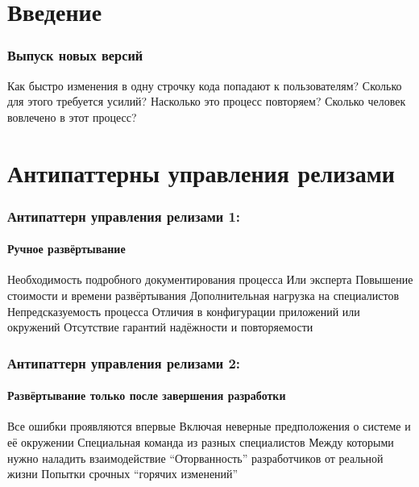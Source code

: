 \documentclass{../../slides-style}
\begin{document}
    \begin{frame}[plain]
        \titlepage
    \end{frame}

    \section{Введение}

    \begin{frame}
        \frametitle{Выпуск новых версий}
        \begin{outline}
            \1 Как быстро изменения в одну строчку кода попадают к пользователям?
            \1 Сколько для этого требуется усилий?
            \1 Насколько это процесс повторяем?
            \1 Сколько человек вовлечено в этот процесс?
        \end{outline}
    \end{frame}

    \section{Антипаттерны управления релизами}

    \begin{frame}
        \frametitle{Антипаттерн управления релизами 1:}
        \framesubtitle{Ручное развёртывание}
        \begin{outline}
            \1 Необходимость подробного документирования процесса
                \2 Или эксперта
            \1 Повышение стоимости и времени развёртывания
                \2 Дополнительная нагрузка на специалистов
            \1 Непредсказуемость процесса
                \2 Отличия в конфигурации приложений или окружений
            \1 Отсутствие гарантий надёжности и повторяемости 
        \end{outline}
    \end{frame}

    \begin{frame}
        \frametitle{Антипаттерн управления релизами 2:}
        \framesubtitle{Развёртывание только после завершения разработки}
        \begin{outline}
            \1 Все ошибки проявляются впервые
                \2 Включая неверные предположения о системе и её окружении
            \1 Специальная команда из разных специалистов
                \2 Между которыми нужно наладить взаимодействие
                \2 ``Оторванность'' разработчиков от реальной жизни
            \1 Попытки срочных ``горячих изменений''
        \end{outline}
    \end{frame}
\end{document}

